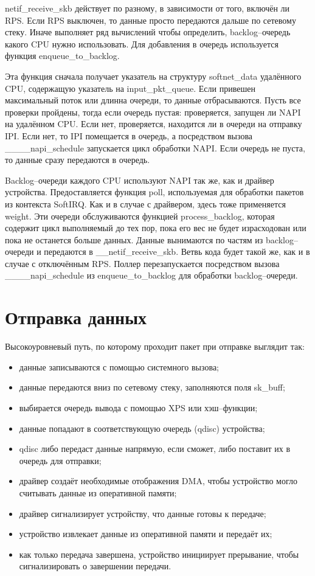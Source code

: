 netif\_receive\_skb действует по разному, в зависимости от того, включён ли RPS. Если RPS выключен, то данные просто передаются дальше по сетевому стеку. Иначе выполняет ряд вычислений чтобы определить, backlog--очередь какого CPU нужно использовать. Для добавления в очередь используется функция enqueue\_to\_backlog.

Эта функция сначала получает указатель на структуру softnet\_data удалённого CPU, содержащую указатель на input\_pkt\_queue. Если привешен максимальный поток или длинна очереди, то данные отбрасываются. Пусть все проверки пройдены, тогда если очередь пустая: проверяется, запущен ли NAPI на удалённом CPU. Если нет, проверяется, находится ли в очереди на отправку IPI. Если нет, то IPI помещается в очередь, а посредством вызова \_\_\_\_napi\_schedule запускается цикл обработки NAPI. Если очередь не пуста, то данные сразу передаются в очередь.

Backlog--очереди каждого CPU используют NAPI так же, как и драйвер устройства. Предоставляется функция poll, используемая для обработки пакетов из контекста SoftIRQ. Как и в случае с драйвером, здесь тоже применяется weight. Эти очереди обслуживаются функцией process\_backlog, которая содержит цикл выполняемый до тех пор, пока его вес не будет израсходован или пока не останется больше данных. Данные вынимаются по частям из backlog--очереди и передаются в \_\_netif\_receive\_skb. Ветвь кода будет такой же, как и в случае с отключённым RPS. Поллер перезапускается посредством вызова \_\_\_\_napi\_schedule из enqueue\_to\_backlog для обработки backlog--очереди.

\section{Отправка данных}

Высокоуровневый путь, по которому проходит пакет при отправке выглядит так:
\begin{itemize}[label=---]
	\item данные записываются с помощью системного вызова;
	\item данные передаются вниз по сетевому стеку, заполняются поля sk\_buff;
	\item выбирается очередь вывода с помощью XPS или хэш--функции;
	\item данные попадают в соответствующую очередь (qdisc) устройства;
	\item qdisc либо передаст данные напрямую, если сможет, либо поставит их в очередь для отправки;
	\item драйвер создаёт необходимые отображения DMA, чтобы устройство могло считывать данные из оперативной памяти;
	\item драйвер сигнализирует устройству, что данные готовы к передаче;
	\item устройство извлекает данные из оперативной памяти и передаёт их;
	\item как только передача завершена, устройство инициирует прерывание, чтобы сигнализировать о завершении передачи.
\end{itemize}


